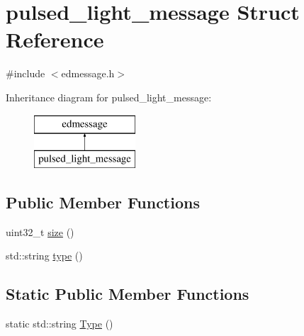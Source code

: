 \hypertarget{structpulsed__light__message}{\section{pulsed\-\_\-light\-\_\-message Struct Reference}
\label{structpulsed__light__message}
}


{\ttfamily \#include $<$edmessage.\-h$>$}

Inheritance diagram for pulsed\-\_\-light\-\_\-message\-:\begin{figure}[H]
\begin{center}
\leavevmode
\includegraphics[height=2.000000cm]{structpulsed__light__message}
\end{center}
\end{figure}
\subsection*{Public Member Functions}
\begin{DoxyCompactItemize}
\item 
uint32\-\_\-t \hyperlink{structpulsed__light__message_a7202312fb93e2deb22bee2a84ac7a78d}{size} ()
\item 
std\-::string \hyperlink{structpulsed__light__message_af69b69dbd86e8fb7dc30ee3a304a5e35}{type} ()
\end{DoxyCompactItemize}
\subsection*{Static Public Member Functions}
\begin{DoxyCompactItemize}
\item 
static std\-::string \hyperlink{structpulsed__light__message_a3be8eb082c93bb7e957eb840436830da}{Type} ()
\end{DoxyCompactItemize}
